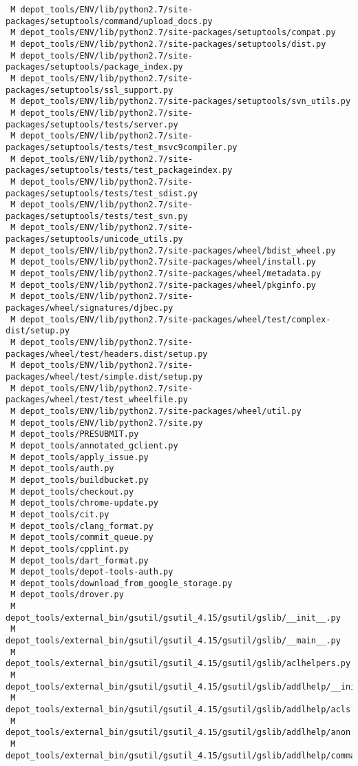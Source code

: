 \documentclass{article}
\begin{document}
\begin{verbatim}
 M depot_tools/ENV/lib/python2.7/site-packages/setuptools/command/upload_docs.py
 M depot_tools/ENV/lib/python2.7/site-packages/setuptools/compat.py
 M depot_tools/ENV/lib/python2.7/site-packages/setuptools/dist.py
 M depot_tools/ENV/lib/python2.7/site-packages/setuptools/package_index.py
 M depot_tools/ENV/lib/python2.7/site-packages/setuptools/ssl_support.py
 M depot_tools/ENV/lib/python2.7/site-packages/setuptools/svn_utils.py
 M depot_tools/ENV/lib/python2.7/site-packages/setuptools/tests/server.py
 M depot_tools/ENV/lib/python2.7/site-packages/setuptools/tests/test_msvc9compiler.py
 M depot_tools/ENV/lib/python2.7/site-packages/setuptools/tests/test_packageindex.py
 M depot_tools/ENV/lib/python2.7/site-packages/setuptools/tests/test_sdist.py
 M depot_tools/ENV/lib/python2.7/site-packages/setuptools/tests/test_svn.py
 M depot_tools/ENV/lib/python2.7/site-packages/setuptools/unicode_utils.py
 M depot_tools/ENV/lib/python2.7/site-packages/wheel/bdist_wheel.py
 M depot_tools/ENV/lib/python2.7/site-packages/wheel/install.py
 M depot_tools/ENV/lib/python2.7/site-packages/wheel/metadata.py
 M depot_tools/ENV/lib/python2.7/site-packages/wheel/pkginfo.py
 M depot_tools/ENV/lib/python2.7/site-packages/wheel/signatures/djbec.py
 M depot_tools/ENV/lib/python2.7/site-packages/wheel/test/complex-dist/setup.py
 M depot_tools/ENV/lib/python2.7/site-packages/wheel/test/headers.dist/setup.py
 M depot_tools/ENV/lib/python2.7/site-packages/wheel/test/simple.dist/setup.py
 M depot_tools/ENV/lib/python2.7/site-packages/wheel/test/test_wheelfile.py
 M depot_tools/ENV/lib/python2.7/site-packages/wheel/util.py
 M depot_tools/ENV/lib/python2.7/site.py
 M depot_tools/PRESUBMIT.py
 M depot_tools/annotated_gclient.py
 M depot_tools/apply_issue.py
 M depot_tools/auth.py
 M depot_tools/buildbucket.py
 M depot_tools/checkout.py
 M depot_tools/chrome-update.py
 M depot_tools/cit.py
 M depot_tools/clang_format.py
 M depot_tools/commit_queue.py
 M depot_tools/cpplint.py
 M depot_tools/dart_format.py
 M depot_tools/depot-tools-auth.py
 M depot_tools/download_from_google_storage.py
 M depot_tools/drover.py
 M depot_tools/external_bin/gsutil/gsutil_4.15/gsutil/gslib/__init__.py
 M depot_tools/external_bin/gsutil/gsutil_4.15/gsutil/gslib/__main__.py
 M depot_tools/external_bin/gsutil/gsutil_4.15/gsutil/gslib/aclhelpers.py
 M depot_tools/external_bin/gsutil/gsutil_4.15/gsutil/gslib/addlhelp/__init__.py
 M depot_tools/external_bin/gsutil/gsutil_4.15/gsutil/gslib/addlhelp/acls.py
 M depot_tools/external_bin/gsutil/gsutil_4.15/gsutil/gslib/addlhelp/anon.py
 M depot_tools/external_bin/gsutil/gsutil_4.15/gsutil/gslib/addlhelp/command_opts.py

\end{verbatim}
\end{document}
